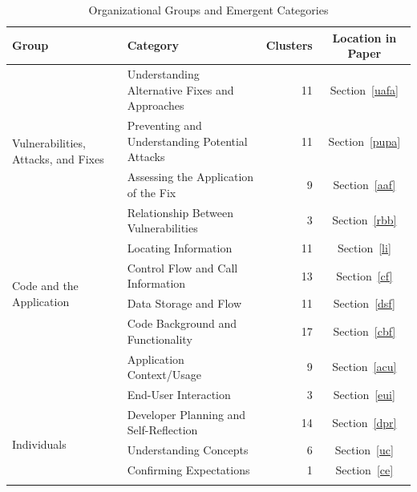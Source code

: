 \documentclass{acm_proc_article-sp}
\begin{document}
\begin{table} 
\centering
\caption{Organizational Groups and Emergent Categories}
\begin{tabular}{|l|l|r|c|}
\rowcolor{gray!50}
\hline
    Group											& Category										& Clusters		& Location in Paper	  	\\
    \hline			
    \multirow{4}{*}{Vulnerabilities, Attacks, and Fixes}
        											& Understanding Alternative Fixes and Approaches	& 11     		& Section~\ref{uafa}	\\

    												& Preventing and Understanding Potential Attacks	& 11     		& Section~\ref{pupa}		\\

    												& Assessing the Application of the Fix				& 9     		& Section~\ref{aaf}				\\

    												& Relationship Between Vulnerabilities							& 3     		& Section~\ref{rbb}			\\
    \hline
    \multirow{4}{*}{Code and the Application}	
    												& Locating Information 								& 11      		& Section~\ref{li}		\\

    												& Control Flow and Call Information					& 13     		& Section~\ref{cf}	\\

    												& Data Storage and Flow								& 11     		& Section~\ref{dsf}  	\\

    												& Code Background and Functionality	 				& 17     		& Section~\ref{cbf}			\\

    									& Application Context/Usage										& 9     		& Section~\ref{acu}			\\

    									& End-User Interaction											& 3     		& Section~\ref{eui}		\\
    \hline	
    \multirow{4}{*}{Individuals}	
    									& Developer Planning and Self-Reflection						& 14    		& Section~\ref{dpr}		\\

    									& Understanding Concepts										& 6 			& Section~\ref{uc}			\\

    									& Confirming Expectations					 					& 1				& Section~\ref{ce}  \\
    \hline
	\multirow{4}{*}{Problem Solving Support}


\end{tabular}
\end{table}
\end{document}
